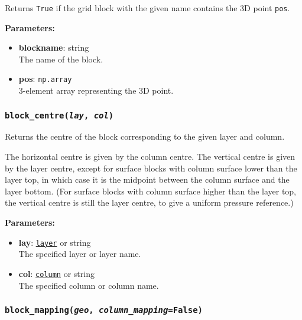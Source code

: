 Returns \texttt{True} if the grid block with the given name contains the 3D point \texttt{pos}.

\textbf{Parameters:}
\begin{itemize}
\item \textbf{blockname}: string\\
  The name of the block.
\item \textbf{pos}: \texttt{np.array}\\
  3-element array representing the 3D point.
\end{itemize}

\begin{snugshade}\subsubsection{\texttt{block\_centre(\emph{lay}, \emph{col})}}\end{snugshade}
\label{sec:mulgrid:block_centre}

Returns the centre of the block corresponding to the given layer and column.

The horizontal centre is given by the column centre. The vertical centre is given by the layer centre, except for surface blocks with column surface lower than the layer top, in which case it is the midpoint between the column surface and the layer bottom.  (For surface blocks with column surface higher than the layer top, the vertical centre is still the layer centre, to give a uniform pressure reference.)

\textbf{Parameters:}
\begin{itemize}
\item \textbf{lay}: \hyperref[layerobjects]{\texttt{layer}} or string\\
  The specified layer or layer name.
\item \textbf{col}: \hyperref[columnobjects]{\texttt{column}} or string\\
  The specified column or column name.
\end{itemize}

\begin{snugshade}\subsubsection{\texttt{block\_mapping(\emph{geo}, \emph{column\_mapping}=\texttt{False})}}\end{snugshade}
\label{sec:mulgrid:block_mapping}

